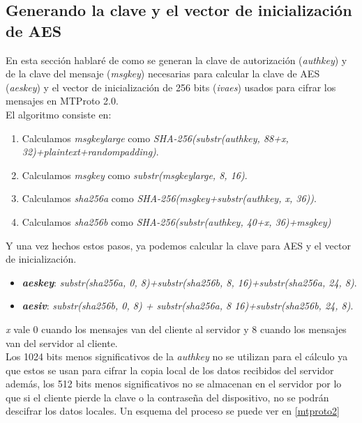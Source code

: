 \subsection{Generando la clave y el vector de inicialización de AES}
En esta sección hablaré de como se generan la clave de autorización (\emph{auth\textunderscore key}) y de la clave del mensaje (\emph{msg\textunderscore key}) necesarias para calcular la clave de AES (\emph{aes\textunderscore key}) y el vector de inicialización de 256 bits (\emph{iv\textunderscore aes}) usados para cifrar los mensajes en MTProto 2.0.\\
El algoritmo consiste en:
\begin{enumerate}
	\item Calculamos \emph{msg\textunderscore key\textunderscore large} como \emph{SHA-256(substr(auth\textunderscore key, 88+x, 32)+plaintext+random\textunderscore padding)}.
	\item Calculamos \emph{msg\textunderscore key} como \emph{substr(msg\textunderscore key\textunderscore large, 8, 16)}.
	\item Calculamos \emph{sha256\textunderscore a} como \emph{SHA-256(msg\textunderscore key+substr(auth\textunderscore key, x, 36))}.
	\item Calculamos \emph{sha256\textunderscore b} como \emph{SHA-256(substr(auth\textunderscore key, 40+x, 36)+msg\textunderscore key)}
\end{enumerate}
Y una vez hechos estos pasos, ya podemos calcular la clave para AES y el vector de inicialización.
\begin{itemize}
	\item \textbf{\emph{aes\textunderscore key}}: \emph{substr(sha256\textunderscore a, 0, 8)+substr(sha256\textunderscore b, 8, 16)+substr(sha256\textunderscore a, 24, 8)}.
	\item \textbf{\emph{aes\textunderscore iv}}: \emph{substr(sha256\textunderscore b, 0, 8) + substr(sha256\textunderscore a, 8 16)+substr(sha256\textunderscore b, 24, 8)}.
\end{itemize}
\emph{x} vale 0 cuando los mensajes van del cliente al servidor y 8 cuando los mensajes van del servidor al cliente.\\
Los 1024 bits menos significativos de la \emph{auth\textunderscore key} no se utilizan para el cálculo ya que estos se usan para cifrar la copia local de los datos recibidos del servidor además, los 512 bits menos significativos no se almacenan en el servidor por lo que si el cliente pierde la clave o la contraseña del dispositivo, no se podrán descifrar los datos locales. Un esquema del proceso se puede ver en \ref{mtproto2}
